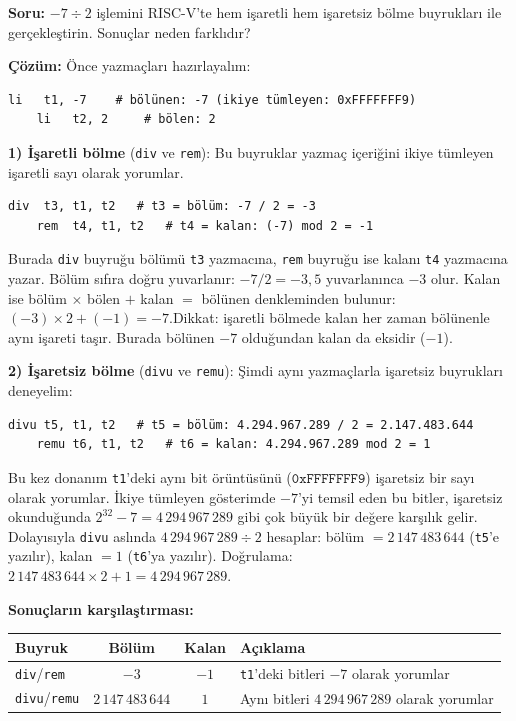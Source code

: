 \begin{ornek}[5.14]
\textbf{Soru:} $-7 \div 2$ işlemini RISC-V'te hem işaretli hem işaretsiz bölme buyrukları ile gerçekleştirin. Sonuçlar neden farklıdır?

\textbf{Çözüm:} Önce yazmaçları hazırlayalım:

\begin{lstlisting}[style=riscv]
    li   t1, -7    # bölünen: -7 (ikiye tümleyen: 0xFFFFFFF9)
    li   t2, 2     # bölen: 2
\end{lstlisting}

\textbf{1) İşaretli bölme} (\texttt{div} ve \texttt{rem}): Bu buyruklar yazmaç içeriğini ikiye tümleyen işaretli sayı olarak yorumlar.

\begin{lstlisting}[style=riscv]
    div  t3, t1, t2   # t3 = bölüm: -7 / 2 = -3
    rem  t4, t1, t2   # t4 = kalan: (-7) mod 2 = -1
\end{lstlisting}

Burada \texttt{div} buyruğu bölümü \texttt{t3} yazmacına, \texttt{rem} buyruğu ise kalanı \texttt{t4} yazmacına yazar. Bölüm sıfıra doğru yuvarlanır: $-7 / 2 = -3{,}5$ yuvarlanınca $-3$ olur. Kalan ise bölüm $\times$ bölen $+$ kalan $=$ bölünen denkleminden bulunur: $(-3) \times 2 + (-1) = -7$.\;\checkmark\quad Dikkat: işaretli bölmede kalan her zaman bölünenle aynı işareti taşır. Burada bölünen $-7$ olduğundan kalan da eksidir ($-1$).

\textbf{2) İşaretsiz bölme} (\texttt{divu} ve \texttt{remu}): Şimdi aynı yazmaçlarla işaretsiz buyrukları deneyelim:

\begin{lstlisting}[style=riscv]
    divu t5, t1, t2   # t5 = bölüm: 4.294.967.289 / 2 = 2.147.483.644
    remu t6, t1, t2   # t6 = kalan: 4.294.967.289 mod 2 = 1
\end{lstlisting}

Bu kez donanım \texttt{t1}'deki aynı bit örüntüsünü ($\texttt{0xFFFFFFF9}$) işaretsiz bir sayı olarak yorumlar. İkiye tümleyen gösterimde $-7$'yi temsil eden bu bitler, işaretsiz okunduğunda $2^{32} - 7 = 4\,294\,967\,289$ gibi çok büyük bir değere karşılık gelir. Dolayısıyla \texttt{divu} aslında $4\,294\,967\,289 \div 2$ hesaplar: bölüm $= 2\,147\,483\,644$ (\texttt{t5}'e yazılır), kalan $= 1$ (\texttt{t6}'ya yazılır). Doğrulama: $2\,147\,483\,644 \times 2 + 1 = 4\,294\,967\,289$.\;\checkmark

\textbf{Sonuçların karşılaştırması:}

\begin{center}
\small
\begin{tabular}{l c c l}
\toprule
\textbf{Buyruk} & \textbf{Bölüm} & \textbf{Kalan} & \textbf{Açıklama} \\
\midrule
\texttt{div}/\texttt{rem} & $-3$ & $-1$ & \texttt{t1}'deki bitleri $-7$ olarak yorumlar \\
\texttt{divu}/\texttt{remu} & $2\,147\,483\,644$ & $1$ & Aynı bitleri $4\,294\,967\,289$ olarak yorumlar \\
\bottomrule
\end{tabular}
\end{center}


\end{ornek}
